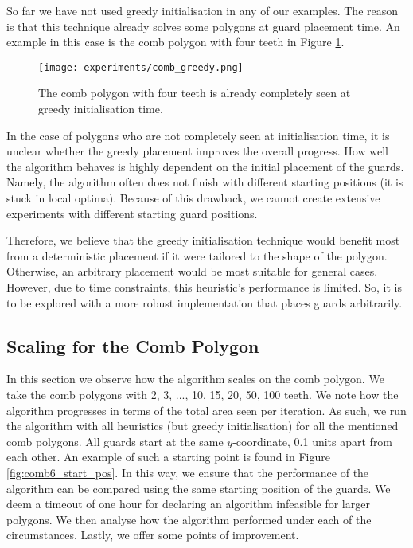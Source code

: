 So far we have not used greedy initialisation in any of our examples. The reason is that this technique already solves some polygons at guard placement time. An example in this case is the comb polygon with four teeth in Figure \ref{fig:comb_greedy}.

\begin{figure}[h!]
    \centering
    \texttt{[image: experiments/comb\_greedy.png]}
    \caption{The comb polygon with four teeth is already completely seen at greedy initialisation time.}
    \label{fig:comb_greedy}
\end{figure}

\newpage
In the case of polygons who are not completely seen at initialisation time, it is unclear whether the greedy placement improves the overall progress. How well the algorithm behaves is highly dependent on the initial placement of the guards. Namely, the algorithm often does not finish with different starting positions (it is stuck in local optima). Because of this drawback, we cannot create extensive experiments with different starting guard positions. 

Therefore, we believe that the greedy initialisation technique would benefit most from a deterministic placement if it were tailored to the shape of the polygon. Otherwise, an arbitrary placement would be most suitable for general cases. However, due to time constraints, this heuristic's performance is limited. So, it is to be explored with a more robust implementation that places guards arbitrarily.

\subsection{Scaling for the Comb Polygon}
In this section we  observe how the algorithm scales on the comb polygon. We  take the comb polygons with 2, 3, ..., 10, 15, 20, 50, 100 teeth. We  note how the algorithm progresses in terms of the total area seen per iteration.
As such, we  run the algorithm with all heuristics (but greedy initialisation) for all the mentioned comb polygons. All guards  start at the same $y$-coordinate, 0.1 units apart from each other. An example of such a starting point is found in Figure \ref{fig:comb6_start_pos}. In this way, we  ensure that the performance of the algorithm can be compared using the same starting position of the guards. We  deem a timeout of one hour for declaring an algorithm infeasible for larger polygons. We  then analyse how the algorithm performed under each of the circumstances. Lastly, we  offer some points of improvement.

